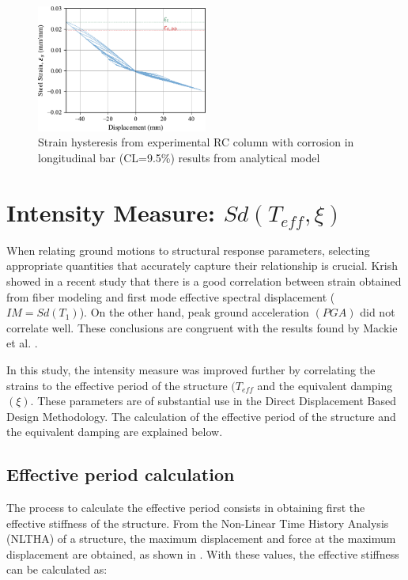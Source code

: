 \begin{figure}[htbp]
	\centering
	\includegraphics[width=0.5\textwidth]{VAC Thesis 2.0/Chapter-5/figs/Calibration_Ma_et_al_strain.pdf}
	\caption{Strain hysteresis from experimental RC column with corrosion in longitudinal bar (CL=9.5\%) results from analytical model}
	\label{fig:ModelCalibration_Corrosion_Hysteresis}
\end{figure}
\newpage
\section{Intensity Measure: $Sd(T_{eff},\xi)$}

When relating ground motions to structural response parameters, selecting appropriate quantities that accurately capture their relationship is crucial. Krish \cite{Krish2018} showed in a recent study that there is a good correlation between strain obtained from fiber modeling and first mode effective spectral displacement ($IM=Sd(T_1)$). On the other hand, peak ground acceleration $(PGA)$ did not correlate well. These conclusions are congruent with the results found by Mackie et al. \cite{Mackie2003}. 

In this study, the intensity measure was improved further by correlating the strains to the effective period of the structure $(T_{eff}$ and the equivalent damping $(\xi)$. These parameters are of substantial use in the Direct Displacement Based Design Methodology. The calculation of the effective period of the structure and the equivalent damping are explained below.

\subsection{Effective period calculation}

The process to calculate the effective period consists in obtaining first the effective stiffness of the structure. From the Non-Linear Time History Analysis (NLTHA) of a structure, the maximum displacement and force at the maximum displacement are obtained, as shown in . With these values, the effective stiffness can be calculated as:

